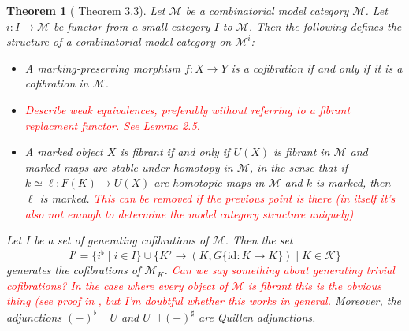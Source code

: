 \documentclass{article}
\newcommand{\todo}[1]{\textcolor{red}{#1}}
\newtheorem{theorem}{Theorem}
\begin{document}
\begin{theorem}[\cite{marked-objects} Theorem 3.3]
  \label{th:marked-model-category}
  Let $\mathcal{M}$ be a combinatorial model category $\mathcal{M}$.
  Let $i : I \rightarrow \mathcal{M}$ be functor from a small category $I$ to $\mathcal{M}$.
  Then the following defines the structure of a combinatorial model category on $\mathcal{M}^i$:
  \begin{itemize}
    \item
      A marking-preserving morphism $f : X \rightarrow Y$ is a cofibration if and only if it is a cofibration in $\mathcal{M}$.
    \item
      \todo{
        Describe weak equivalences, preferably without referring to a fibrant replacment functor.
        See \cite{marked-objects} Lemma 2.5.
      }
    \item
      A marked object $X$ is fibrant if and only if $U(X)$ is fibrant in $\mathcal{M}$ and marked maps are stable under homotopy in $\mathcal{M}$, in the sense that if $k \simeq \ell : F(K) \rightarrow U(X)$ are homotopic maps in $\mathcal{M}$ and $k$ is marked, then $\ell$ is marked.
      \todo{This can be removed if the previous point is there (in itself it's also not enough to determine the model category structure uniquely)}
  \end{itemize}
  Let $I$ be a set of generating cofibrations of $\mathcal{M}$.
  Then the set
  \begin{equation}
    I' = \{ i^\flat \mid i \in I \} \cup \{ K^\flat \rightarrow (K, G\{\mathrm{id} : K \rightarrow K\}) \mid K \in \mathcal{K} \}
  \end{equation}
  generates the cofibrations of $\mathcal{M}_K$.
  \todo{
    Can we say something about generating trivial cofibrations?
    In the case where every object of $\mathcal{M}$ is fibrant this is the obvious thing (see proof in \cite{marked-objects}, but I'm doubtful whether this works in general.
  }
  Moreover, the adjunctions $(-)^\flat \dashv U$ and $U \dashv (-)^\sharp$ are Quillen adjunctions.
\end{theorem}
\end{document}
